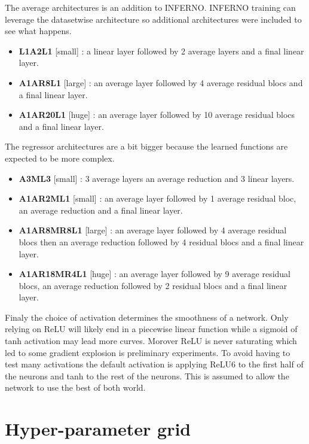 The average architectures is an addition to INFERNO.
INFERNO training can leverage the datasetwise architecture so additional architectures were included to see what happens.
\begin{itemize}
	\item \textbf{L1A2L1} [small] : a linear layer followed by 2 average layers and a final linear layer.
	\item \textbf{A1AR8L1} [large] : an average layer followed by 4 average residual blocs and a final linear layer.
	\item \textbf{A1AR20L1} [huge] : an average layer followed by 10 average residual blocs and a final linear layer.
\end{itemize}

The regressor architectures are a bit bigger because the learned functions are expected to be more complex.
\begin{itemize}
	\item \textbf{A3ML3} [small] : 3 average layers an average reduction and 3 linear layers.
	\item \textbf{A1AR2ML1} [small] : an average layer followed by 1 average residual bloc, an average reduction and a final linear layer.
	\item \textbf{A1AR8MR8L1} [large] : an average layer followed by 4 average residual blocs then an average reduction followed by 4 residual blocs and a final linear layer.
	\item \textbf{A1AR18MR4L1} [huge] : an average layer followed by 9 average residual blocs, an average reduction followed by 2 residual blocs and a final linear layer.
\end{itemize}

Finaly the choice of activation determines the smoothness of a network.
Only relying on ReLU will likely end in a piecewise linear function while a sigmoid of tanh activation may lead more curves.
Morover ReLU is never saturating which led to some gradient explosion is preliminary experiments. 
To avoid having to test many activations the default activation is applying ReLU6 to the first half of the neurons and tanh to the rest of the neurons.
This is assumed to allow the network to use the best of both world.








\section{Hyper-parameter grid} %
\label{sec:hyper_parameter_grid}

